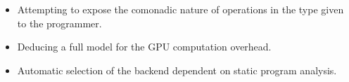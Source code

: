 \documentclass[12pt,a4paper,twoside]{scrbook}
\begin{document}
\begin{itemize}
\item
  Attempting to expose the comonadic nature of operations in the type given to
  the programmer.
\item
  Deducing a full model for the GPU computation overhead.
\item
  Automatic selection of the backend dependent on static program analysis.
\end{itemize}

\printbibliography[heading=bibintoc]

\appendix


\end{document}
